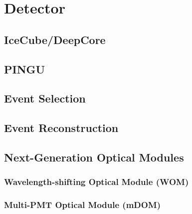 \chapter{Detector}
\label{sec:det}


\section{IceCube/DeepCore}
\label{sec:ICDC}


\section{PINGU}
\label{sec:PINGU}


\section{Event Selection}
\label{sec:EvtSel}


\section{Event Reconstruction}
\label{sec:EvtReco}


\section{Next-Generation Optical Modules}
\label{sec:EvtReco}

\subsection{Wavelength-shifting Optical Module (WOM)}


\subsection{Multi-PMT Optical Module (mDOM)}